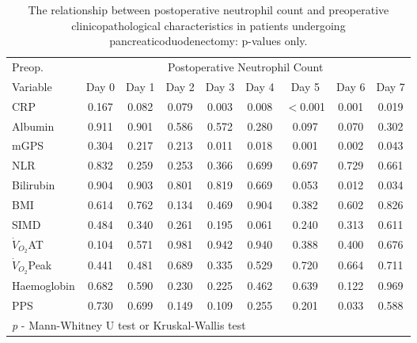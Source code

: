\begin{sidewaystable}[p]
	\caption{The relationship  between postoperative neutrophil count and preoperative clinicopathological characteristics in patients undergoing pancreaticoduodenectomy: p-values only. }
	\label{table:sirs_neut_pvalues}
	\centering
	\renewcommand{\arraystretch}{1.2} %
	\begin{tabular}{|l | c c c c c c c c|}
			\hline
			Preop.              &       \multicolumn{8}{c|}{Postoperative Neutrophil  Count}       \\
			Variable            & Day 0 & Day 1 & Day 2 & Day 3 & Day 4 & Day 5    & Day 6 & Day 7 \\ \hline
			CRP                 & 0.167 & 0.082 & 0.079 & 0.003 & 0.008 & $<$0.001 & 0.001 & 0.019 \\
			Albumin             & 0.911 & 0.901 & 0.586 & 0.572 & 0.280 & 0.097    & 0.070 & 0.302 \\
			mGPS                & 0.304 & 0.217 & 0.213 & 0.011 & 0.018 & 0.001    & 0.002 & 0.043 \\
			NLR                 & 0.832 & 0.259 & 0.253 & 0.366 & 0.699 & 0.697    & 0.729 & 0.661 \\
			Bilirubin           & 0.904 & 0.903 & 0.801 & 0.819 & 0.669 & 0.053    & 0.012 & 0.034 \\
			BMI                 & 0.614 & 0.762 & 0.134 & 0.469 & 0.904 & 0.382    & 0.602 & 0.826 \\
			SIMD                & 0.484 & 0.340 & 0.261 & 0.195 & 0.061 & 0.240    & 0.313 & 0.611 \\
			$\dot{V}_{O_2}$AT   & 0.104 & 0.571 & 0.981 & 0.942 & 0.940 & 0.388    & 0.400 & 0.676 \\
			$\dot{V}_{O_2}$Peak & 0.441 & 0.481 & 0.689 & 0.335 & 0.529 & 0.720    & 0.664 & 0.711 \\
			Haemoglobin         & 0.682 & 0.590 & 0.230 & 0.225 & 0.462 & 0.639    & 0.122 & 0.969 \\
			PPS                 & 0.730 & 0.699 & 0.149 & 0.109 & 0.255 & 0.201    & 0.033 & 0.588 \\ \hline
			\multicolumn{9}{l}{\textit{p} - Mann-Whitney U test or Kruskal-Wallis test}
		\end{tabular}
\end{sidewaystable}